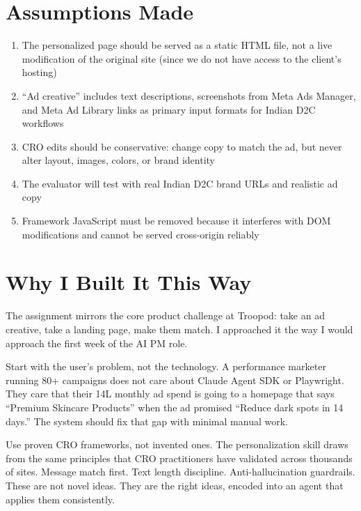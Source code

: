 \documentclass{article}
\begin{document}
\section{Assumptions Made}

\begin{enumerate}[leftmargin=2em]
    \item The personalized page should be served as a static HTML file, not a live modification of the original site (since we do not have access to the client's hosting)
    \item ``Ad creative'' includes text descriptions, screenshots from Meta Ads Manager, and Meta Ad Library links as primary input formats for Indian D2C workflows
    \item CRO edits should be conservative: change copy to match the ad, but never alter layout, images, colors, or brand identity
    \item The evaluator will test with real Indian D2C brand URLs and realistic ad copy
    \item Framework JavaScript must be removed because it interferes with DOM modifications and cannot be served cross-origin reliably
\end{enumerate}

\section{Why I Built It This Way}

The assignment mirrors the core product challenge at Troopod: take an ad creative, take a landing page, make them match. I approached it the way I would approach the first week of the AI PM role.

Start with the user's problem, not the technology. A performance marketer running 80+ campaigns does not care about Claude Agent SDK or Playwright. They care that their \rupee 14L monthly ad spend is going to a homepage that says ``Premium Skincare Products'' when the ad promised ``Reduce dark spots in 14 days.'' The system should fix that gap with minimal manual work.

Use proven CRO frameworks, not invented ones. The personalization skill draws from the same principles that CRO practitioners have validated across thousands of sites. Message match first. Text length discipline. Anti-hallucination guardrails. These are not novel ideas. They are the right ideas, encoded into an agent that applies them consistently.
\end{document}

